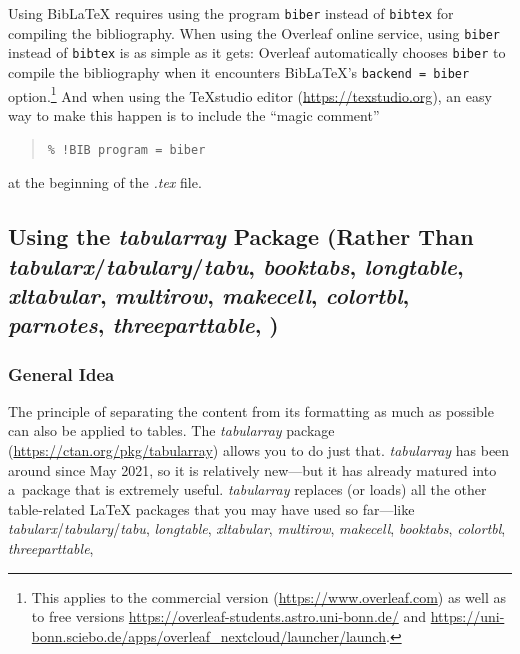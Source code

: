 Using BibLaTeX requires using the program \verb|biber| instead of \verb|bibtex| for compiling the bibliography. When using the Overleaf online service, using \verb|biber| instead of \verb|bibtex| is as simple as it gets: Overleaf automatically chooses \verb|biber| to compile the bibliography when it encounters BibLaTeX's \verb|backend = biber| option.\footnote{This applies to the commercial version (\url{https://www.overleaf.com}) as well as to free versions \url{https://overleaf-students.astro.uni-bonn.de/} and \url{https://uni-bonn.sciebo.de/apps/overleaf_nextcloud/launcher/launch}.} And when using the TeXstudio editor (\url{https://texstudio.org}), an easy way to make this happen is to include the ``magic comment''
\begin{quote}
	\verb|% !BIB program = biber|
\end{quote}
at the beginning of the \textit{.tex} file.

\subsection{Using the \mbox{\textit{tabularray}} Package (Rather Than \mbox{\textit{tabularx}}\slash \mbox{\textit{tabulary}}\slash \mbox{\textit{tabu}}, \mbox{\textit{booktabs}}, \mbox{\textit{longtable}}, \mbox{\textit{xltabular}}, \mbox{\textit{multirow}}, \mbox{\textit{makecell}}, \mbox{\textit{colortbl}}, \mbox{\textit{parnotes}}, \mbox{\textit{threeparttable}}, \textellipsis\!)}

\subsubsection{General Idea}
The principle of separating the content from its formatting as much as possible can also be applied to tables. The \mbox{\textit{tabularray}} package (\url{https://ctan.org/pkg/tabularray}) allows you to do just that. \mbox{\textit{tabularray}} has been around since May 2021, so it is relatively new---but it has already matured into a~package that is extremely useful. \mbox{\textit{tabularray}} replaces (or loads) all the other table-related LaTeX packages that you may have used so far---like \mbox{\textit{tabularx}}\slash\mbox{\textit{tabulary}}\slash\mbox{\textit{tabu}}, \mbox{\textit{longtable}}, \mbox{\textit{xltabular}}, \mbox{\textit{multirow}}, \mbox{\textit{makecell}}, \mbox{\textit{booktabs}}, \mbox{\textit{colortbl}}, \mbox{\textit{threeparttable}}, \textellipsis

